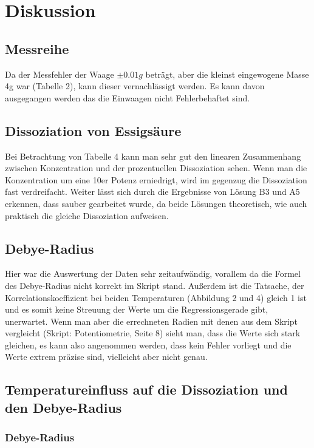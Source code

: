 \section{Diskussion}

\subsection{Messreihe}
Da der Messfehler der Waage $\pm 0.01g$ beträgt, aber die kleinst eingewogene Masse 4g war (Tabelle 2), kann dieser vernachlässigt werden. Es kann davon
ausgegangen werden das die Einwaagen nicht Fehlerbehaftet sind.

\subsection{Dissoziation von Essigsäure}
Bei Betrachtung von Tabelle 4 kann man sehr gut den linearen Zusammenhang zwischen Konzentration und der prozentuellen Dissoziation sehen. 
Wenn man die Konzentration um eine 10er Potenz erniedrigt, wird im gegenzug die Dissoziation fast verdreifacht. 
Weiter lässt sich durch die Ergebnisse von Lösung B3 und A5 erkennen, dass sauber gearbeitet wurde, da beide Lösungen theoretisch, wie auch praktisch die gleiche
Dissoziation aufweisen.

\subsection{Debye-Radius}
Hier war die Auswertung der Daten sehr zeitaufwändig, vorallem da die Formel des Debye-Radius nicht korrekt im Skript stand. 
Außerdem ist die Tatsache, der Korrelationskoeffizient bei beiden Temperaturen (Abbildung 2 und 4) gleich 1 ist und es somit keine Streuung der Werte um die Regressionsgerade 
gibt, unerwartet. Wenn man aber die errechneten Radien mit denen aus dem Skript vergleicht (Skript: Potentiometrie, Seite 8) sieht man, dass die Werte sich stark gleichen,
es kann also angenommen werden, dass kein Fehler vorliegt und die Werte extrem präzise sind, vielleicht aber nicht genau.


\subsection{Temperatureinfluss auf die Dissoziation und den Debye-Radius}

\subsubsection{Debye-Radius}

